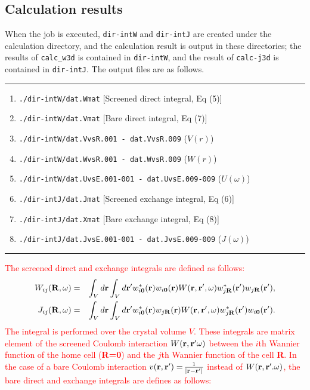 \documentclass{article}
\newcommand{\tr}[1]{\textcolor{red}{#1}}
\begin{document}
\subsection{\label{result-calc-int}Calculation results}
When the job is executed, \verb+dir-intW+ and \verb+dir-intJ+ are created under the calculation directory, and the calculation result is output in these directories; the results of \verb+calc_w3d+ is contained in \verb+dir-intW+, and the result of \verb+calc-j3d+ is contained in \verb+dir-intJ+. The output files are as follows.
\vspace{3mm}\hrule
\begin{enumerate}
\item \verb+./dir-intW/dat.Wmat+ [Screened direct integral, Eq (5)]
\item \verb+./dir-intW/dat.Vmat+ [Bare direct integral, Eq (7)] 
\item \verb+./dir-intW/dat.VvsR.001 - dat.VvsR.009+ ($V(r)$) 
\item \verb+./dir-intW/dat.WvsR.001 - dat.WvsR.009+ ($W(r)$)
\item \verb+./dir-intW/dat.UvsE.001-001 - dat.UvsE.009-009+ ($U(\omega)$)
\item \verb+./dir-intJ/dat.Jmat+ [Screened exchange integral, Eq (6)] 
\item \verb+./dir-intJ/dat.Xmat+ [Bare exchange integral, Eq (8)]
\item \verb+./dir-intJ/dat.JvsE.001-001 - dat.JvsE.009-009+ ($J(\omega)$)
\end{enumerate}
\hrule\vspace{3mm}
\tr{The screened direct and exchange integrals are defined as follows:}  
\begin{eqnarray}
W_{ij}({\bf R},\omega)&=&\int_V d{\bf r} \int_V  d{\bf r'}
w_{i{\bf 0}}^*({\bf r}) 
w_{i{\bf 0}}({\bf r}) 
W({\bf r,r'},\omega) 
w_{j{\bf R}}^*({\bf r'}) 
w_{j{\bf R}}({\bf r'}), \label{Wij} \\
J_{ij}({\bf R},\omega)&=&\int_V  d{\bf r}\int_V d{\bf r'}
w_{i{\bf 0}}^*({\bf r}) 
w_{j{\bf R}}({\bf r}) 
W({\bf r,r'},\omega) 
w_{j{\bf R}}^*({\bf r'}) 
w_{i{\bf 0}}({\bf r'}). \label{Jij}
\end{eqnarray}
\tr{The integral is performed over the crystal volume $V$. These integrals are matrix element of the screened Coulomb interaction $W({\bf r,r'} \omega)$ between the $i$th Wannier function of the home cell ({\bf R=0}) and the $j$th Wannier function of the cell {\bf R}. In the case of a bare Coulomb interaction $v({\bf r,r'})=${\Large $\frac{1}{|{\bf r-r'}|}$} instead of $W({\bf r,r'}.\omega)$, the bare direct and exchange integrals are defines as follows:} 
\end{document}
